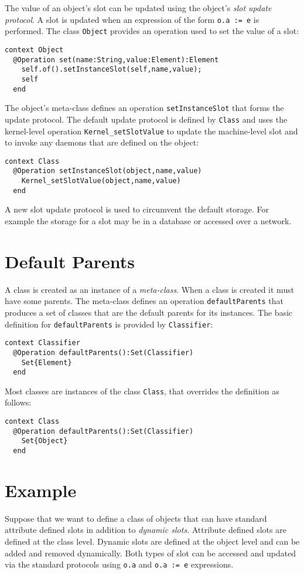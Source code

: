 \documentclass{article}
\begin{document}
The value of an object's slot can be updated using the object's {\em slot update protocol}. A slot
is updated when an expression of the form {\tt o.a := e} is performed. The class {\tt Object}
provides an operation used to set the value of a slot:
\begin{verbatim}
context Object
  @Operation set(name:String,value:Element):Element
    self.of().setInstanceSlot(self,name,value);
    self
  end
\end{verbatim}
The object's meta-class defines an operation {\tt setInstanceSlot} that forms the update
protocol. The default update protocol is defined by {\tt Class} and uses the kernel-level
operation {\tt Kernel\_setSlotValue} to update the machine-level slot and to invoke any daemons
that are defined on the object:
\begin{verbatim}
context Class
  @Operation setInstanceSlot(object,name,value)
    Kernel_setSlotValue(object,name,value)
  end
\end{verbatim}
A new slot update protocol is used to circumvent the default storage. For example the storage for
a slot may be in a database or accessed over a network. 

\section{Default Parents}

A class is created as an instance of a {\em meta-class}. When a class is created it must have some parents.
The meta-class defines an operation {\tt defaultParents} that produces a set of classes that are the
default parents for its instances. The basic definition for {\tt defaultParents} is provided by
{\tt Classifier}:
\begin{verbatim}
context Classifier
  @Operation defaultParents():Set(Classifier)
    Set{Element}
  end
\end{verbatim}
Most classes are instances of the class {\tt Class}, that overrides the definition as follows:
\begin{verbatim}
context Class
  @Operation defaultParents():Set(Classifier)
    Set{Object}
  end
\end{verbatim}

\section{Example}

Suppose that we want to define a class of objects that can have standard attribute defined 
slots in addition to {\em dynamic slots}. Attribute defined slots are defined at the class
level. Dynamic slots are defined at the object level and can be added and removed 
dynamically. Both types of slot can be accessed and updated via the standard protocols using
{\tt o.a} and {\tt o.a := e} expressions.
\end{document}

